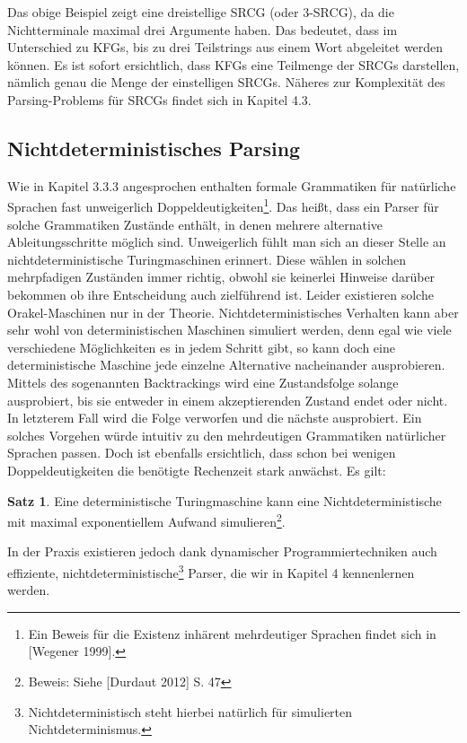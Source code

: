 \documentclass[12pt,a4paper]{article}
\theoremstyle{definition}
\begin{document}
		Das obige Beispiel zeigt eine dreistellige SRCG (oder 3-SRCG), da die Nichtterminale maximal drei Argumente haben. Das bedeutet, dass im Unterschied zu KFGs, bis zu drei Teilstrings aus einem Wort abgeleitet werden können. Es ist sofort ersichtlich, dass KFGs eine Teilmenge der SRCGs darstellen, nämlich genau die Menge der einstelligen SRCGs. Näheres zur Komplexität des Parsing-Problems für SRCGs findet sich in Kapitel 4.3.
		
	\subsection{Nichtdeterministisches Parsing}
		Wie in Kapitel 3.3.3 angesprochen enthalten formale Grammatiken für natürliche Sprachen fast unweigerlich Doppeldeutigkeiten\footnote{Ein Beweis für die Existenz inhärent mehrdeutiger Sprachen findet sich in [Wegener 1999].}. Das heißt, dass ein Parser für solche Grammatiken Zustände enthält, in denen mehrere alternative Ableitungsschritte möglich sind. Unweigerlich fühlt man sich an dieser Stelle an nichtdeterministische Turingmaschinen erinnert. Diese wählen in solchen mehrpfadigen Zuständen immer richtig, obwohl sie keinerlei Hinweise darüber bekommen ob ihre Entscheidung auch zielführend ist. Leider existieren solche Orakel-Maschinen nur in der Theorie. Nichtdeterministisches Verhalten kann aber sehr wohl von deterministischen Maschinen simuliert werden, denn egal wie viele verschiedene Möglichkeiten es in jedem Schritt gibt, so kann doch eine deterministische Maschine jede einzelne Alternative nacheinander ausprobieren. Mittels des sogenannten Backtrackings wird eine Zustandsfolge solange ausprobiert, bis sie entweder in einem akzeptierenden Zustand endet oder nicht. In letzterem Fall wird die Folge verworfen und die nächste ausprobiert. Ein solches Vorgehen würde intuitiv zu den mehrdeutigen Grammatiken natürlicher Sprachen passen. Doch ist ebenfalls ersichtlich, dass schon bei wenigen Doppeldeutigkeiten die benötigte Rechenzeit stark anwächst. Es gilt:
	
			\newtheorem{simulated-nt}{Satz}[subsection]
			\begin{simulated-nt}
				Eine deterministische Turingmaschine kann eine Nichtdeterministische mit maximal exponentiellem Aufwand simulieren\footnote{Beweis: Siehe [Durdaut 2012] S. 47}.
			\end{simulated-nt}
	
		In der Praxis existieren jedoch dank dynamischer Programmiertechniken auch effiziente, nichtdeterministische\footnote{Nichtdeterministisch steht hierbei natürlich für simulierten Nichtdeterminismus.} Parser, die wir in Kapitel 4 kennenlernen werden.
	
\end{document}
